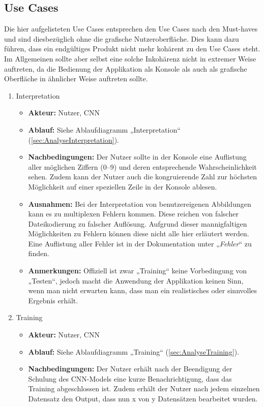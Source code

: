 \subsection{Use Cases}
\label{sec:AnalyseUseCases}
Die hier aufgelisteten Use Cases entsprechen den Use Cases nach den Must-haves und sind diesbezüglich ohne die grafische Nutzeroberfläche. Dies kann dazu führen, dass ein endgültiges Produkt nicht mehr kohärent zu den Use Cases steht. Im Allgemeinen sollte aber selbst eine solche Inkohärenz nicht in extremer Weise auftreten, da die Bedienung der Applikation als Konsole als auch als grafische Oberfläche in ähnlicher Weise auftreten sollte.
\begin{enumerate}
	\item Interpretation
		\begin{itemize}
			\item \textbf{Akteur:} Nutzer, CNN
			\item \textbf{Ablauf:} Siehe Ablaufdiagramm „Interpretation“ (\ref{sec:AnalyseInterpretation}).
			\item \textbf{Nachbedingungen:} Der Nutzer sollte in der Konsole eine Auflistung aller möglichen Ziffern (0–9) und deren entsprechende Wahrscheinlichkeit sehen. Zudem kann der Nutzer auch die kongruierende Zahl zur höchsten Möglichkeit auf einer speziellen Zeile in der Konsole ablesen.
			\item \textbf{Ausnahmen:} Bei der Interpretation von benutzereigenen Abbildungen kann es zu multiplexen Fehlern kommen. Diese reichen von falscher Dateikodierung zu falscher Auflösung. Aufgrund dieser mannigfaltigen Möglichkeiten zu Fehlern können diese nicht alle hier erläutert werden. Eine Auflistung aller Fehler ist in der Dokumentation unter „\textit{Fehler}“ zu finden.
			\item \textbf{Anmerkungen:} Offiziell ist zwar „Training“ keine Vorbedingung von „Testen“, jedoch macht die Anwendung der Applikation keinen Sinn, wenn man nicht erwarten kann, dass man ein realistisches oder sinnvolles Ergebnis erhält.
		\end{itemize}
	\item Training
	\begin{itemize}
		\item \textbf{Akteur:} Nutzer, CNN
		\item \textbf{Ablauf:} Siehe Ablaufdiagramm „Training“ (\ref{sec:AnalyseTraining}).
		\item \textbf{Nachbedingungen:} Der Nutzer erhält nach der Beendigung der Schulung des CNN-Models eine kurze Benachrichtigung, dass das Training abgeschlossen ist. Zudem erhält der Nutzer nach jedem einzelnen Datensatz den Output, dass nun x von y Datensätzen bearbeitet wurden.

\end{itemize}
\end{enumerate}
